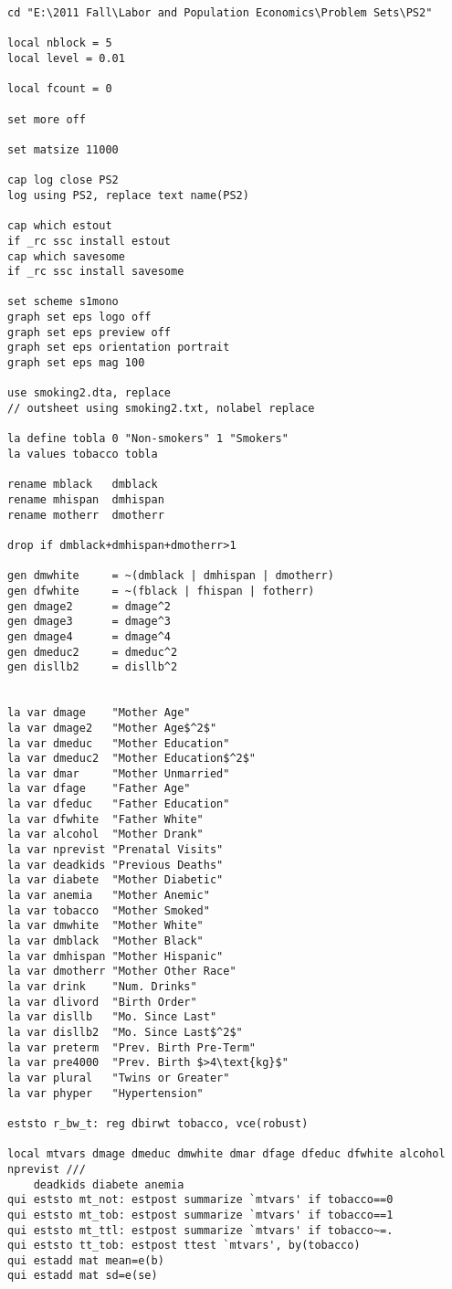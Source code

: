 \documentclass{article}
\begin{document}
\begin{verbatim}
cd "E:\2011 Fall\Labor and Population Economics\Problem Sets\PS2"

local nblock = 5
local level = 0.01

local fcount = 0

set more off

set matsize 11000

cap log close PS2
log using PS2, replace text name(PS2)

cap which estout
if _rc ssc install estout
cap which savesome
if _rc ssc install savesome

set scheme s1mono
graph set eps logo off
graph set eps preview off
graph set eps orientation portrait
graph set eps mag 100

use smoking2.dta, replace
// outsheet using smoking2.txt, nolabel replace

la define tobla 0 "Non-smokers" 1 "Smokers"
la values tobacco tobla

rename mblack	dmblack
rename mhispan	dmhispan
rename motherr	dmotherr

drop if dmblack+dmhispan+dmotherr>1

gen dmwhite		= ~(dmblack | dmhispan | dmotherr)
gen dfwhite		= ~(fblack | fhispan | fotherr)
gen dmage2		= dmage^2
gen dmage3		= dmage^3
gen dmage4		= dmage^4
gen dmeduc2		= dmeduc^2
gen disllb2		= disllb^2


la var dmage	"Mother Age"
la var dmage2	"Mother Age$^2$"
la var dmeduc	"Mother Education"
la var dmeduc2	"Mother Education$^2$"
la var dmar		"Mother Unmarried"
la var dfage	"Father Age"
la var dfeduc	"Father Education"
la var dfwhite	"Father White"
la var alcohol	"Mother Drank"
la var nprevist	"Prenatal Visits"
la var deadkids	"Previous Deaths"
la var diabete	"Mother Diabetic"
la var anemia	"Mother Anemic"
la var tobacco	"Mother Smoked"
la var dmwhite	"Mother White"
la var dmblack	"Mother Black"
la var dmhispan	"Mother Hispanic"
la var dmotherr	"Mother Other Race"
la var drink	"Num. Drinks"
la var dlivord	"Birth Order"
la var disllb	"Mo. Since Last"
la var disllb2	"Mo. Since Last$^2$"
la var preterm	"Prev. Birth Pre-Term"
la var pre4000	"Prev. Birth $>4\text{kg}$"
la var plural	"Twins or Greater"
la var phyper	"Hypertension"

eststo r_bw_t: reg dbirwt tobacco, vce(robust)

local mtvars dmage dmeduc dmwhite dmar dfage dfeduc dfwhite alcohol nprevist ///
	deadkids diabete anemia
qui eststo mt_not: estpost summarize `mtvars' if tobacco==0
qui eststo mt_tob: estpost summarize `mtvars' if tobacco==1
qui eststo mt_ttl: estpost summarize `mtvars' if tobacco~=.
qui eststo tt_tob: estpost ttest `mtvars', by(tobacco)
qui estadd mat mean=e(b)
qui estadd mat sd=e(se)


\end{verbatim}
\end{document}
